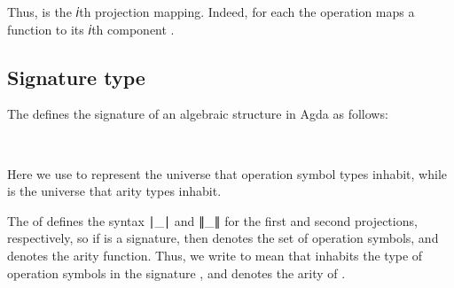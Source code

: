 \documentclass[a4paper,UKenglish,cleveref, autoref, thm-restate]{lipics-v2019}
\begin{document}
Thus, \AgdaSpace{} is the 𝑖th projection mapping. Indeed, for each\AgdaSpace{}\AgdaSpace{}\AgdaSymbol{:}\AgdaSpace{}\AgdaSpace{} the operation
\AgdaSpace{}\AgdaSpace{}\AgdaSymbol{:}\AgdaSpace{}\AgdaSpace{}%
\AgdaSpace{}%
 maps a function
\AgdaSpace{}%
\AgdaSymbol{:}\AgdaSpace{}%
\AgdaSpace{}%
\AgdaSpace{}%
to its 𝑖th component \AgdaSpace{}.

\subsection{Signature type}
The \agdaualib defines the signature of an algebraic structure in Agda as follows:
\begin{code}%
\>[0]\AgdaSpace{}%
\AgdaSymbol{:}\AgdaSpace{}%
\AgdaSymbol{(}\AgdaSpace{}%
\AgdaSpace{}%
\AgdaSymbol{:}\AgdaSpace{}%
\AgdaSymbol{)}\AgdaSpace{}%
\AgdaSpace{}%
\AgdaSpace{}%
\AgdaSpace{}%
\AgdaSpace{}%
\AgdaSpace{}%
\AgdaSpace{}%
\<%
\\
\>[0]\AgdaSpace{}%
\AgdaSpace{}%
\AgdaSpace{}%
\AgdaSymbol{=}\AgdaSpace{}%
\AgdaSpace{}%
\AgdaSpace{}%
\AgdaSpace{}%
\AgdaSpace{}%
%
\>[27]\AgdaFunction{,}\AgdaSpace{}%
\AgdaSymbol{(}\AgdaSpace{}%
\AgdaSpace{}%
\AgdaSpace{}%
\AgdaSpace{}%
\AgdaSpace{}%
\AgdaSymbol{)}\<%
\end{code}
Here we use  to represent the universe that operation symbol types inhabit, while  is the universe that arity types inhabit.

The \preludemodule of \agdaualib defines the syntax ∣\_∣ and ∥\_∥ for the first and second projections, respectively, so if \AgdaSpace{}\AgdaSpace{}\signatureOV is a signature, then \AgdaSpace{}\AgdaSpace{} denotes the set of operation symbols, and \AgdaSpace{}\AgdaSpace{} denotes the arity function. Thus, we write \AgdaSpace{}\AgdaSpace{}\AgdaSpace{}\AgdaSpace{} to mean that  inhabits the type of operation symbols in the signature , and \AgdaSpace{}\AgdaSpace{}\AgdaSpace{} denotes the arity of .
\end{document}
